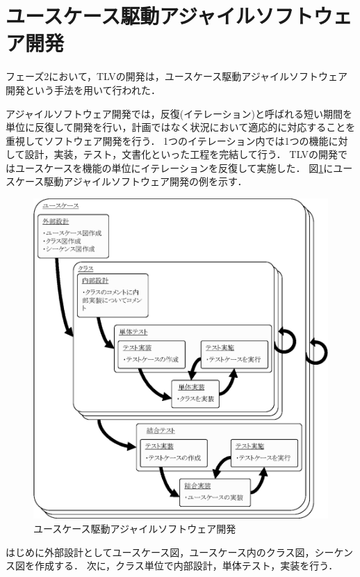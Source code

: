 \section{ユースケース駆動アジャイルソフトウェア開発}
\label{usecaseAgile}

フェーズ2において，TLVの開発は，ユースケース駆動アジャイルソフトウェア開発という手法を用いて行われた．

アジャイルソフトウェア開発では，反復(イテレーション)と呼ばれる短い期間を単位に反復して開発を行い，計画ではなく状況において適応的に対応することを重視してソフトウェア開発を行う．
1つのイテレーション内では1つの機能に対して設計，実装，テスト，文書化といった工程を完結して行う．
TLVの開発ではユースケースを機能の単位にイテレーションを反復して実施した．
図\ref{fig:agile}にユースケース駆動アジャイルソフトウェア開発の例を示す．

\begin{figure}[t]
\begin{center}
\includegraphics[scale=0.75]{img/agile.eps}
\caption{ユースケース駆動アジャイルソフトウェア開発}
\label{fig:agile}
\end{center}
\end{figure}

はじめに外部設計としてユースケース図，ユースケース内のクラス図，シーケンス図を作成する．
次に，クラス単位で内部設計，単体テスト，実装を行う．

